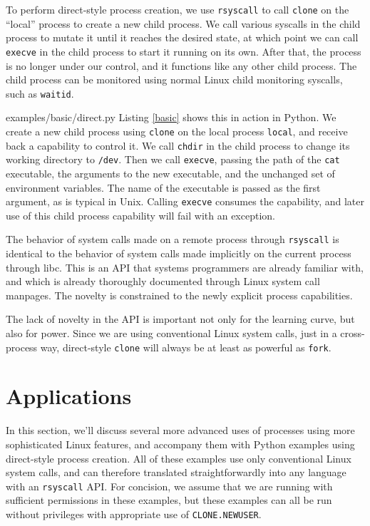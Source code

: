 \documentclass[letterpaper,twocolumn,10pt]{article}
\begin{document}
To perform direct-style process creation,
we use \texttt{rsyscall} to call \texttt{clone} on the ``local'' process to create a new child process.
We call various syscalls in the child process to mutate it until it reaches the desired state,
at which point we can call \texttt{execve} in the child process to start it running on its own.
After that, the process is no longer under our control, and it functions like any other child process.
The child process can be monitored using normal Linux child monitoring syscalls,
such as \texttt{waitid}.


{examples/basic/direct.py}
Listing \ref{basic} shows this in action in Python.
We create a new child process using \texttt{clone} on the local process \verb|local|,
and receive back a capability to control it.
We call \texttt{chdir} in the child process to change its working directory to \texttt{/dev}.
Then we call \texttt{execve},
passing the path of the \texttt{cat} executable,
the arguments to the new executable,
and the unchanged set of environment variables.
The name of the executable is passed as the first argument,
as is typical in Unix.
Calling \texttt{execve} consumes the capability,
and later use of this child process capability will fail with an exception.

The behavior of system calls made on a remote process through \texttt{rsyscall}
is identical to the behavior of system calls made implicitly on the current process through libc.
This is an API that systems programmers are already familiar with,
and which is already thoroughly documented through Linux system call manpages.
The novelty is constrained to the newly explicit process capabilities.

The lack of novelty in the API is important not only for the learning curve,
but also for power.
Since we are using conventional Linux system calls,
just in a cross-process way,
direct-style \texttt{clone} will always be at least as powerful as \texttt{fork}.
\section{Applications}\label{applications}
In this section,
we'll discuss several more advanced uses of processes
using more sophisticated Linux features,
and accompany them with Python examples using direct-style process creation.
All of these examples use only conventional Linux system calls,
and can therefore translated straightforwardly into any language with an \texttt{rsyscall} API.
For concision, we assume that we are running with sufficient permissions in these examples,
but these examples can all be run without privileges with appropriate use of \texttt{CLONE.NEWUSER}.
\end{document}
